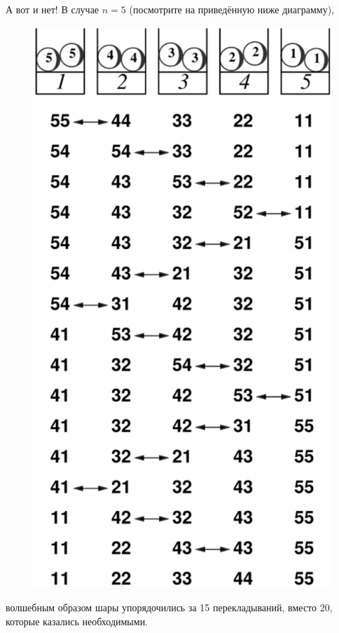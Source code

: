 А вот и нет!
В случае $n = 5$ (посмотрите на приведённую ниже диаграмму),
\begin{figure}[h!]
\centering
\includegraphics[scale=0.5]{Figs/UnsolvedPuzzles/5bin}
\end{figure}
волшебным образом шары упорядочились за 15 перекладываний, вместо 20, которые казались необходимыми.

